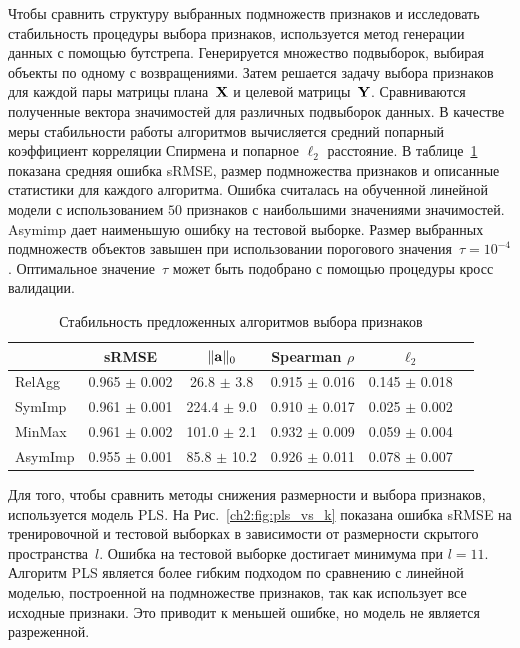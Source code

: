 Чтобы сравнить структуру выбранных подмножеств признаков и исследовать стабильность процедуры выбора признаков, используется метод генерации данных с помощью бутстрепа. 
Генерируется множество подвыборок, выбирая объекты по одному с возвращениями. 
Затем решается задачу выбора признаков для каждой пары матрицы плана~$\mathbf{X}$ и целевой матрицы~$\mathbf{Y}$.
Сравниваются полученные вектора значимостей для различных подвыборок данных. 
В качестве меры стабильности работы алгоритмов вычисляется средний попарный коэффициент корреляции Спирмена и попарное $\ell_2$ расстояние.
В таблице~\ref{ch2:tbl:stability} показана средняя ошибка sRMSE, размер подмножества признаков и описанные статистики для каждого алгоритма. 
Ошибка считалась на обученной линейной модели с использованием $50$ признаков с наибольшими значениями значимостей.
Asymimp дает наименьшую ошибку на тестовой выборке. 
Размер выбранных подмножеств объектов завышен при использовании порогового значения~$\tau=10^{-4}$. 
Оптимальное значение~$\tau$ может быть подобрано с помощью процедуры кросс валидации.

\begin{table}[ht]
	\caption{Стабильность предложенных алгоритмов выбора признаков}
	\centering
	\begin{tabular}{l|ccccc}
		\hline
		& sRMSE  & $\|\mathbf{a}\|_0$ & Spearman $\rho$ & $\ell_2$ \\ \hline
		RelAgg & 0.965 $\pm$ 0.002 & 26.8 $\pm$ 3.8 & 0.915 $\pm$ 0.016 & 0.145 $\pm$ 0.018   \\
		SymImp & 0.961 $\pm$ 0.001 & 224.4 $\pm$ 9.0 & 0.910 $\pm$ 0.017 & 0.025 $\pm$ 0.002   \\
		MinMax & 0.961 $\pm$ 0.002 & 101.0 $\pm$ 2.1& 0.932 $\pm$ 0.009 & 0.059 $\pm$ 0.004   \\
		AsymImp & 0.955 $\pm$ 0.001 & 85.8 $\pm$ 10.2& 0.926 $\pm$ 0.011 & 0.078 $\pm$ 0.007  \\ \hline
	\end{tabular}
	\label{ch2:tbl:stability}
\end{table}

Для того, чтобы сравнить методы снижения размерности и выбора признаков, используется модель PLS. 
На Рис.~\ref{ch2:fig:pls_vs_k} показана ошибка sRMSE на тренировочной и тестовой выборках в зависимости от размерности скрытого пространства~$l$.
Ошибка на тестовой выборке достигает минимума при $l = 11$.
Алгоритм PLS является более гибким подходом по сравнению с линейной моделью, построенной на подмножестве признаков, так как использует все исходные признаки.
Это приводит к меньшей ошибке, но модель не является разреженной.

